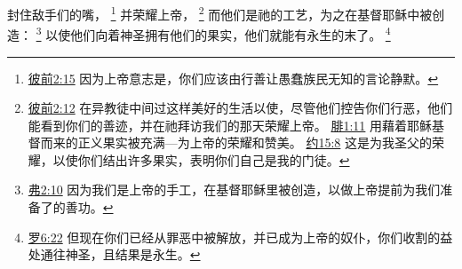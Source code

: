 \documentclass[12pt, a4paper, oneside]{ctexart}
\begin{document}
	封住敌手们的嘴，
	\footnote {
		\href{https://biblehub.com/1_peter/2-15.htm}{彼前2:15} 因为上帝意志是，你们应该由行善让愚蠢族民无知的言论静默。
	}
	并荣耀上帝，
	\footnote {
		\href{https://biblehub.com/1_peter/2-12.htm}{彼前2:12} 在异教徒中间过这样美好的生活以使，尽管他们控告你们行恶，他们能看到你们的善迹，并在祂拜访我们的那天荣耀上帝。
		\href{https://biblehub.com/philippians/1-11.htm}{腓1:11} 用藉着耶稣基督而来的正义果实被充满---为上帝的荣耀和赞美。
		\href{https://biblehub.com/john/15-8.htm}{约15:8} 这是为我圣父的荣耀，以使你们结出许多果实，表明你们自己是我的门徒。
	}
	而他们是祂的工艺，为之在基督耶稣中被创造：
	\footnote {
		\href{https://biblehub.com/ephesians/2-10.htm}{弗2:10} 因为我们是上帝的手工，在基督耶稣里被创造，以做上帝提前为我们准备了的善功。
	}
	以使他们向着神圣拥有他们的果实，他们就能有永生的末了。
	\footnote {
		\href{https://biblehub.com/romans/6-22.htm}{罗6:22} 但现在你们已经从罪恶中被解放，并已成为上帝的奴仆，你们收割的益处通往神圣，且结果是永生。
	}
\end{document}
